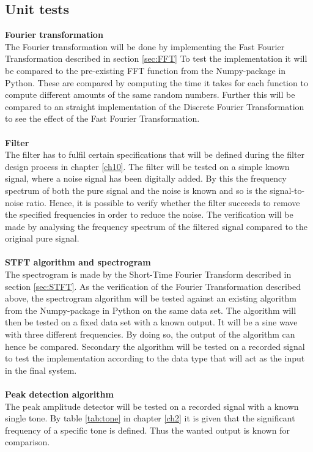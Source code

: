 \subsection{Unit tests} 
\textbf{Fourier transformation} \\
The Fourier transformation will be done by implementing the Fast Fourier Transformation described in section \ref{sec:FFT} 
To test the implementation it will be compared to the pre-existing FFT function from the Numpy-package in Python. These are compared by computing the time it takes for each function to compute different amounts of the same random numbers. Further this will be compared to an straight  implementation of the Discrete Fourier Transformation to see the effect of the Fast Fourier Transformation.\\
\\
\textbf{Filter}\\
The filter has to fulfil certain specifications that will be defined during the filter design process in chapter \ref{ch10}. The filter will be tested on a simple known signal, where a noise signal has been digitally added. By this the frequency spectrum of both the pure signal and the noise is known and so is the signal-to-noise ratio. Hence, it is possible to verify whether the filter succeeds to remove the specified frequencies in order to reduce the noise. The verification will be made by analysing the frequency spectrum of the filtered signal compared to the original pure signal. \\
\\
\textbf{STFT algorithm and spectrogram}\\
The spectrogram is made by the Short-Time Fourier Transform described in section \ref{sec:STFT}. As the verification of the Fourier Transformation described above, the spectrogram algorithm will be tested against an existing algorithm from the Numpy-package in Python on the same data set.
The algorithm will then be tested on a fixed data set with a known output. It will be a sine wave with three different frequencies. By doing so, the output of the algorithm can hence be compared.
Secondary the algorithm will be tested on a recorded signal to test the implementation according to the data type that will act as the input in the final system. 
\\
\\
\textbf{Peak detection algorithm}\\
The peak amplitude detector will be tested on a recorded signal with a known single tone. By table \ref{tab:tone} in chapter \ref{ch2} it is given that the significant frequency of a specific tone is defined. Thus the wanted output is known for comparison.         

